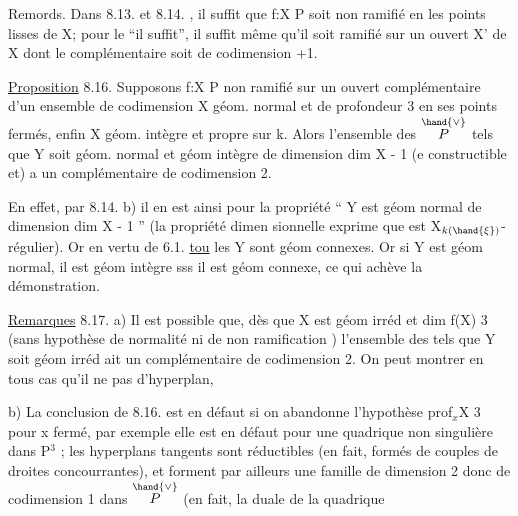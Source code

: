 

Remords. Dans 8.13. et 8.14. , il suffit  que f:X\hand{$\to$} P soit non
ramifié en les points lisses de X; pour le ``il suffit'', il suffit même
qu'il soit  ramifié sur un ouvert X' de X dont le complémentaire soit
de codimension \hand{$\geqslant$} +1.

\uline{Proposition} 8.16. Supposons f:X\hand{$\to$} P non ramifié sur un ouvert
complémentaire d'un ensemble de codimension  X géom. normal et
de profondeur\hand{$\geqslant$} 3 en ses points fermés, enfin X géom. intègre et propre
sur k. Alors l'ensemble des \hand{$\xi \in$} $\overset{\hand{\vee}}{P}$ tels que 
Y\hand{$_\xi$} soit géom. normal et géom intègre de dimension dim X - 1 (e
constructible et) a un complémentaire de codimension \hand{$\geqslant$} 2.

En effet, par 8.14. b) il en est ainsi pour la propriété
`` Y\hand{$_\xi$} est géom normal de dimension dim X - 1 '' (la propriété dimen
sionnelle exprime que \hand{$\phi_\xi$} est X$_{k(\hand{\xi})}$-régulier). Or en vertu de 6.1.
\uline{tou} les Y\hand{$_\xi$} sont géom connexes. Or si Y\hand{$_\xi$} est géom normal, il est
géom intègre sss il est géom connexe, ce qui achève la démonstration.

\uline{Remarques} 8.17. a)  Il est possible que, dès que X est géom irréd
et dim f(X) \hand{$\geqslant$} 3 (sans hypothèse de normalité ni de non ramification )
l'ensemble des \hand{$\xi$} tels que Y\hand{$_\xi$} soit géom irréd ait un complémentaire
de codimension \hand{$\geqslant$}2. On peut montrer en tous cas qu'il ne pas
d'hyperplan, 

b) La conclusion de 8.16. est en défaut si on abandonne
l'hypothèse prof$_x$X \hand{$\geqslant$} 3 pour x fermé, par exemple elle est en défaut pour
une quadrique non singulière  dans P$^3$ ;   les hyperplans tangents
 sont  réductibles (en fait, formés de couples de droites
concourrantes), et forment par ailleurs une famille de dimension 2
 donc de codimension 1 dans $\overset{\hand{\vee}}{P}$ (en fait, la duale de la quadrique  
